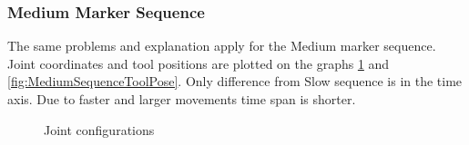 \documentclass[]{scrartcl}
\begin{document}
\subsubsection*{Medium Marker Sequence}
The same problems and explanation apply for the Medium marker sequence. Joint coordinates and tool positions are plotted on the graphs \ref{fig:MediumSequenceJoints} and \ref{fig:MediumSequenceToolPose}. Only difference from Slow sequence is in the time axis. Due to faster and larger movements time span is shorter.
\begin{figure}[!htp]
	\hfill
	\caption{Joint configurations}
	\label{fig:MediumSequenceJoints}
\end{figure}
\end{document}

